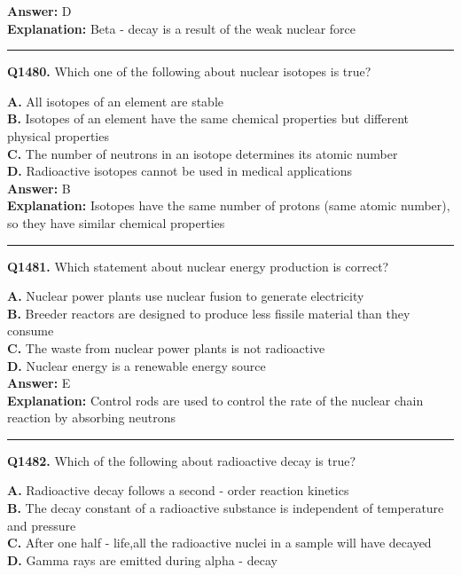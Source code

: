 \documentclass[12pt]{article}
\begin{document}
\textbf{Answer:} D \\
\textbf{Explanation:} Beta - decay is a result of the weak nuclear force

\hrule
\vspace{1em}


\noindent
\textbf{Q1480.} Which one of the following about nuclear isotopes is true?



\textbf{A.} All isotopes of an element are stable \\
\textbf{B.} Isotopes of an element have the same chemical properties but different physical properties \\
\textbf{C.} The number of neutrons in an isotope determines its atomic number \\
\textbf{D.} Radioactive isotopes cannot be used in medical applications \\

\textbf{Answer:} B \\
\textbf{Explanation:} Isotopes have the same number of protons (same atomic number), so they have similar chemical properties

\hrule
\vspace{1em}


\noindent
\textbf{Q1481.} Which statement about nuclear energy production is correct?



\textbf{A.} Nuclear power plants use nuclear fusion to generate electricity \\
\textbf{B.} Breeder reactors are designed to produce less fissile material than they consume \\
\textbf{C.} The waste from nuclear power plants is not radioactive \\
\textbf{D.} Nuclear energy is a renewable energy source \\

\textbf{Answer:} E \\
\textbf{Explanation:} Control rods are used to control the rate of the nuclear chain reaction by absorbing neutrons

\hrule
\vspace{1em}


\noindent
\textbf{Q1482.} Which of the following about radioactive decay is true?



\textbf{A.} Radioactive decay follows a second - order reaction kinetics \\
\textbf{B.} The decay constant of a radioactive substance is independent of temperature and pressure \\
\textbf{C.} After one half - life,all the radioactive nuclei in a sample will have decayed \\
\textbf{D.} Gamma rays are emitted during alpha - decay \\
\end{document}
